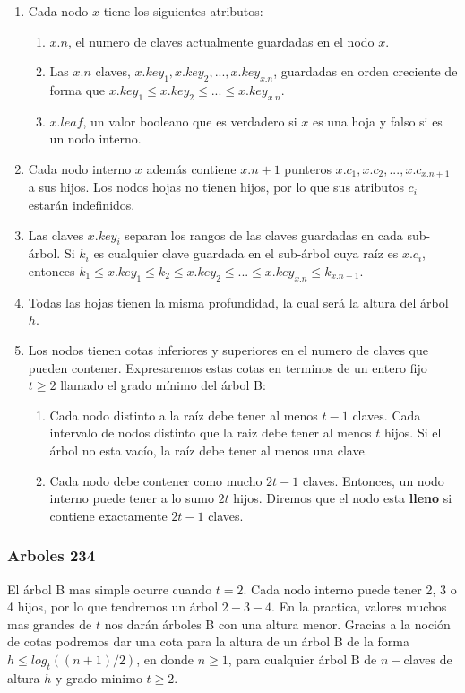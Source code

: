 \begin{enumerate}
 \item Cada nodo $x$ tiene los siguientes atributos:
 \begin{enumerate}
  \item $x.n$, el numero de claves actualmente guardadas en el nodo $x$.
  \item Las $x.n$ claves, $x.key_1, x.key_2, ..., x.key_{x.n}$, guardadas en orden creciente de forma que $x.key_1\leq x.key_2\leq ...\leq x.key_{x.n}$.
  \item $x.leaf$, un valor booleano que es verdadero si $x$ es una hoja y falso si es un nodo interno.
 \end{enumerate}
 \item Cada nodo interno $x$ adem\'as contiene $x.n+1$ punteros $x.c_1,x.c_2,...,x.c_{x.n+1}$ a sus hijos. Los nodos hojas no tienen hijos, por lo que sus atributos $c_i$ estar\'an indefinidos.
 \item Las claves $x.key_i$ separan los rangos de las claves guardadas en cada sub-\'arbol. Si $k_i$ es cualquier clave guardada en el sub-\'arbol cuya ra\'iz es $x.c_i$, entonces $k_1 \leq x.key_1 \leq k_2 \leq x.key_2 \leq ... \leq x.key_{x.n} \leq k_{x.n+1}$.
 \item Todas las hojas tienen la misma profundidad, la cual ser\'a la altura del \'arbol $h$.
 \item Los nodos tienen cotas inferiores y superiores en el numero de claves que pueden contener. Expresaremos estas cotas en terminos de un entero fijo $t \geq 2$ llamado el grado m\'inimo del \'arbol B:
 \begin{enumerate}
  \item Cada nodo distinto a la ra\'iz debe tener al menos $t-1$ claves. Cada intervalo de nodos distinto que la raiz debe tener al menos $t$ hijos. Si el \'arbol no esta vac\'io, la ra\'iz debe tener al menos una clave.
  \item Cada nodo debe contener como mucho $2t-1$ claves. Entonces, un nodo interno puede tener a lo sumo $2t$ hijos. Diremos que el nodo esta \textbf{lleno} si contiene exactamente $2t - 1$ claves.
 \end{enumerate}
\end{enumerate}

\subsubsection{Arboles 234}
El \'arbol B mas simple ocurre cuando $t=2$. Cada nodo interno puede tener 2, 3 o 4 hijos, por lo que tendremos un \'arbol $2-3-4$. En la practica, valores muchos mas grandes de $t$ nos dar\'an \'arboles B con una altura menor. Gracias a la noci\'on de cotas podremos dar una cota para la altura de un \'arbol B de la forma $h \leq log_t((n+1)/2)$, en donde $n \geq 1$, para cualquier \'arbol B de $n-$claves de altura $h$ y grado minimo $t \geq 2$.

